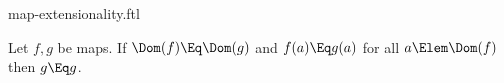 \documentclass{stex}
\begin{document}
\begin{smodule}{map-extensionality.ftl}


\begin{fakeforthel}
  \begin{axiom}
    Let $f,g$ be maps.
    If $\Dom(f) \Eq \Dom(g)$ and $f(a) \Eq g(a)$ for all $a \Elem \Dom(f)$ then $g \Eq g$.
  \end{axiom}
\end{fakeforthel}

\end{smodule}
\end{document}
